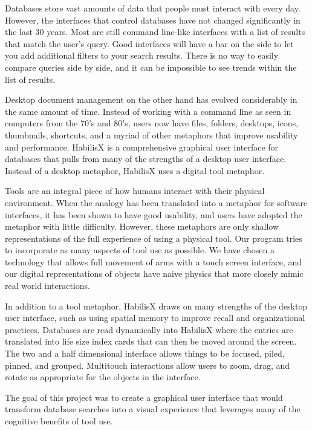 \documentclass{article}
\begin{document}
Databases store vast amounts of data that people must interact with every day.  However, the interfaces that control databases have not changed significantly in the last 30 years.  Most are still command line-like  interfaces with a list of results that match the user's query.  Good interfaces will have a bar on the side to let you add additional filters to your search results.  There is no way to easily compare queries side by side, and it can be impossible to see trends within the list of results.

Desktop document management on the other hand has evolved considerably in the same amount of time.  Instead of working with a command line as seen in computers from the 70's and 80's, users now have files, folders, desktops, icons, thumbnails, shortcuts, and a myriad of other metaphors that improve usability and performance.   HabilisX is a comprehensive graphical user interface for databases that pulls from many of the strengths of a desktop user interface. Instead of a desktop metaphor, HabilisX uses a digital tool metaphor.

Tools are an integral piece of how humans interact with their physical environment.  When the analogy has been translated into a metaphor for software interfaces, it has been shown to have good usability, and users have adopted the metaphor with little difficulty.  However, these metaphors are only shallow representations of the full experience of using a physical tool.  Our program tries to incorporate as many aspects of tool use as possible.  We have chosen a technology that allows full movement of arms with a touch screen interface, and our digital representations of objects have naive physics that more closely mimic real world interactions.

In addition to a tool metaphor, HabilisX draws on many strengths of the desktop user interface, such as using spatial memory to improve recall and organizational practices.  Databases are read dynamically into HabilisX where the entries are translated into life size index cards that can then be moved around the screen.  The two and a half dimensional interface allows things to be focused, piled, pinned, and grouped.  Multitouch interactions allow users to zoom, drag, and rotate as appropriate for the objects in the interface. 


The goal of this project was to create a graphical user interface that would transform database searches into a visual experience that leverages many of the cognitive benefits of tool use.
\end{document}
